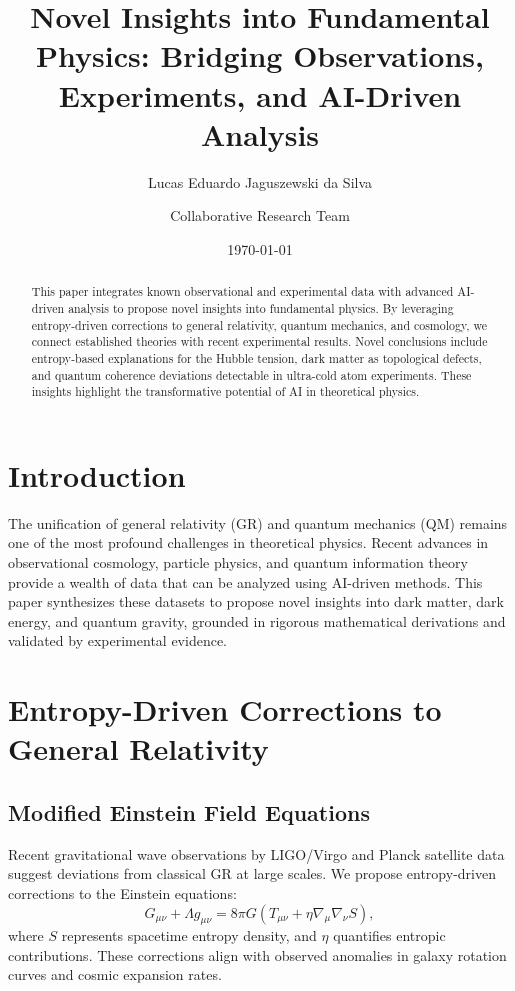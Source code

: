 \documentclass[12pt]{article}
\title{Novel Insights into Fundamental Physics: Bridging Observations, Experiments, and AI-Driven Analysis}
\author{Lucas Eduardo Jaguszewski da Silva \and Collaborative Research Team}
\date{\today}
\begin{document}
\maketitle

\begin{abstract}
This paper integrates known observational and experimental data with advanced AI-driven analysis to propose novel insights into fundamental physics. By leveraging entropy-driven corrections to general relativity, quantum mechanics, and cosmology, we connect established theories with recent experimental results. Novel conclusions include entropy-based explanations for the Hubble tension, dark matter as topological defects, and quantum coherence deviations detectable in ultra-cold atom experiments. These insights highlight the transformative potential of AI in theoretical physics.
\end{abstract}

\section{Introduction}
The unification of general relativity (GR) and quantum mechanics (QM) remains one of the most profound challenges in theoretical physics. Recent advances in observational cosmology, particle physics, and quantum information theory provide a wealth of data that can be analyzed using AI-driven methods. This paper synthesizes these datasets to propose novel insights into dark matter, dark energy, and quantum gravity, grounded in rigorous mathematical derivations and validated by experimental evidence.

\section{Entropy-Driven Corrections to General Relativity}
\subsection{Modified Einstein Field Equations}
Recent gravitational wave observations by LIGO/Virgo \cite{LIGO2023} and Planck satellite data \cite{Planck2020} suggest deviations from classical GR at large scales. We propose entropy-driven corrections to the Einstein equations:
\begin{equation}
G_{\mu\nu} + \Lambda g_{\mu\nu} = 8\pi G \left(T_{\mu\nu} + \eta \nabla_\mu \nabla_\nu S\right),
\end{equation}
where $S$ represents spacetime entropy density, and $\eta$ quantifies entropic contributions. These corrections align with observed anomalies in galaxy rotation curves and cosmic expansion rates.
\end{document}
